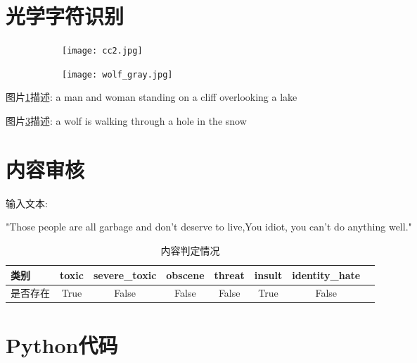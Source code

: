 \documentclass{article}
\begin{document}
\newpage


\section{光学字符识别}




\begin{figure}[h!]
    \centering
    \begin{subfigure}{0.4\textwidth}
        \centering
        \texttt{[image: cc2.jpg]}
        \caption{}
        \label{fig:subfig3}
    \end{subfigure}
    \hfill
    \begin{subfigure}{0.4\textwidth}
        \centering  
        \texttt{[image: wolf\_gray.jpg]}
        \caption{}
        \label{fig:subfig4}
    \end{subfigure}

\end{figure}

图片\ref{fig:subfig3}描述: a man and woman standing on a cliff overlooking a lake

图片\ref{fig:subfig4}描述: a wolf is walking through a hole in the snow


\section{内容审核}

输入文本:

"Those people are all garbage and don't deserve to live,You idiot, you can't do anything well."

\begin{table}[h!]
    \centering
    \begin{tabular}{l c c c c c c c }
    \hline

    类别 & toxic & severe\_toxic & obscene & threat & insult & identity\_hate \\   \hline

    是否存在 & True & False & False & False & True & False \\
 
    \hline
    \end{tabular}
    \caption{内容判定情况}
    \end{table}


\newpage
\section{Python代码}
\end{document}

